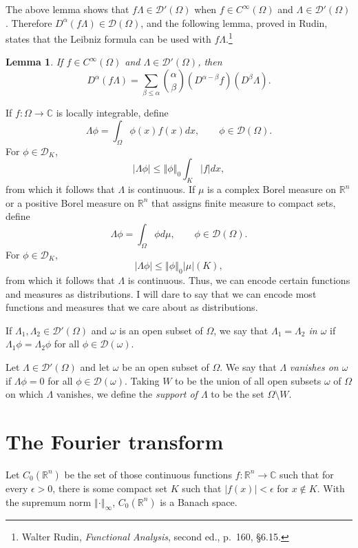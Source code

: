 \documentclass{article}
\newcommand{\norm}[1]{\left\Vert #1 \right\Vert}
\newtheorem{lemma}[theorem]{Lemma}
\theoremstyle{definition}
\begin{document}
The above lemma shows that $f \Lambda \in \mathscr{D}'(\Omega)$ when $f \in C^\infty(\Omega)$ and $\Lambda \in \mathscr{D}'(\Omega)$.
Therefore $D^\alpha(f\Lambda) \in \mathscr{D}(\Omega)$, and the following lemma, proved in Rudin, states that the Leibniz formula can be used with $f\Lambda$.\footnote{Walter Rudin, {\em Functional Analysis}, second ed.,
p.~160, \S 6.15.}

\begin{lemma}
If $f \in C^\infty(\Omega)$ and $\Lambda \in \mathscr{D}'(\Omega)$, then 
\[
D^\alpha(f\Lambda) = \sum_{\beta \leq \alpha} \binom{\alpha}{\beta} (D^{\alpha-\beta}f)(D^\beta \Lambda).
\]
\label{leibniz}
\end{lemma}


If $f:\Omega \to \mathbb{C}$ is locally integrable,  define
\[
\Lambda \phi =\int_{\Omega} \phi(x) f(x) dx, \qquad \phi \in \mathscr{D}(\Omega).
\]
For $\phi \in \mathscr{D}_K$,
\[
|\Lambda \phi | \leq \norm{\phi}_0 \int_K |f| dx,
\]
from which it follows that $\Lambda$ is continuous. 
If $\mu$ is a complex Borel measure on $\mathbb{R}^n$ or a positive Borel measure on $\mathbb{R}^n$ that assigns finite measure to compact
sets,  define
\[
\Lambda \phi = \int_{\Omega} \phi d\mu, \qquad \phi \in \mathscr{D}(\Omega).
\]
For $\phi \in \mathscr{D}_K$,
\[
|\Lambda \phi| \leq \norm{\phi}_0 |\mu|(K),
\]
from which it follows that $\Lambda$ is continuous.
Thus, we can encode certain functions and measures as distributions. I will dare to say that we can encode most functions and measures
that we  care about as distributions.


If $\Lambda_1,\Lambda_2 \in \mathscr{D}'(\Omega)$ and $\omega$ is an open subset of $\Omega$, we say that
{\em $\Lambda_1 = \Lambda_2$ in $\omega$} if $\Lambda_1 \phi = \Lambda_2 \phi$ for all $\phi \in \mathscr{D}(\omega)$. 

Let $\Lambda \in \mathscr{D}'(\Omega)$ and let  $\omega$ be an open subset of $\Omega$. We say that $\Lambda$
{\em vanishes on $\omega$} if $\Lambda \phi = 0$ for all $\phi \in \mathscr{D}(\omega)$.
Taking $W$ to be the union of all open subsets $\omega$ of $\Omega$ on which $\Lambda$ vanishes, we define the {\em support of $\Lambda$} to be the set 
$\Omega \setminus W$. 




\section{The Fourier transform}
Let $C_0(\mathbb{R}^n)$ be the set of those continuous functions $f:\mathbb{R}^n \to \mathbb{C}$ such that for every $\epsilon>0$, there is some compact
set $K$ such that $|f(x)|<\epsilon$ for $x \not \in K$. With the supremum norm $\norm{\cdot}_\infty$, $C_0(\mathbb{R}^n)$ is a Banach space.
\end{document}
